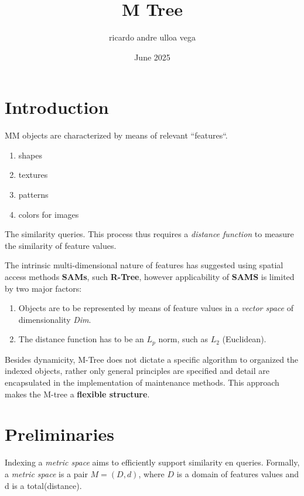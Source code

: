 \documentclass{article}
\title{M Tree}
\author{ricardo andre ulloa vega}
\date{June 2025}
\begin{document}
	
	\maketitle
	
	\section{Introduction}
		MM objects are characterized by means of relevant ``features``.
		
		\begin{enumerate}
		
		\item shapes
		\item  textures
		\item  patterns
		\item  colors for images
		\end{enumerate}
		
		The similarity queries. This process thus requires a \textit{distance function} to measure the similarity of feature values.
		
		The intrinsic multi-dimensional nature of features has suggested using spatial access methods \textbf{SAMs}, such \textbf{R-Tree}, however applicability of \textbf{SAMS} is limited by two major factors:
		\begin{enumerate}
			\item Objects are to be represented by means of feature values in a \textit{vector space} of dimensionality \textit{Dim}.
			\item The distance function has to be an $L_{p}$ norm, such as $L_{2}$ (Euclidean).
		\end{enumerate}
				
		\begin{tcolorbox}[colback=gray!10, colframe=gray!50, sharp corners, boxrule=0.5pt]
			Besides dynamicity, M-Tree does not dictate a specific algorithm to organized the indexed objects, rather only general principles are specified and detail are encapsulated in the implementation of maintenance methods.
			This approach makes the M-tree a \textbf{flexible structure}.
		\end{tcolorbox}

		
		
	\section{Preliminaries}
		Indexing a \textit{metric space}  aims to efficiently support similarity en queries.
		Formally, a \textit{metric space} is a pair $M = (D, d)$, where $D$ is a domain of features values and d is a total(distance).
					
\end{document}

